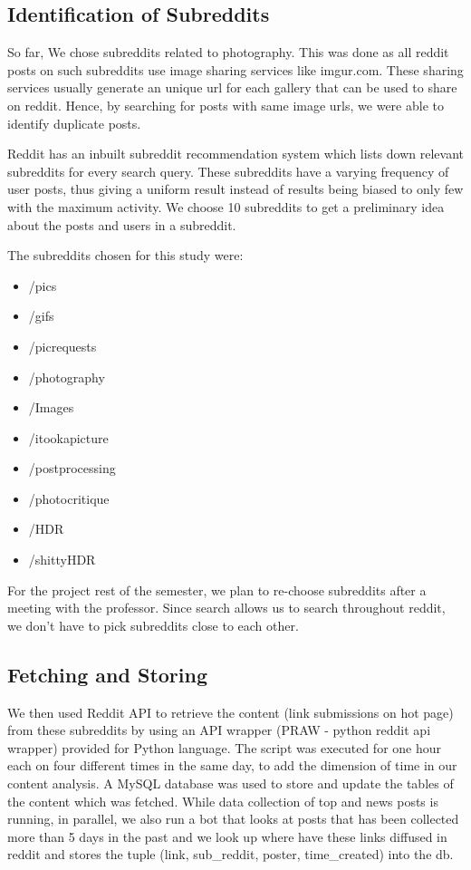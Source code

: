 \documentclass{article} %
\begin{document}
\subsection{Identification of Subreddits}

So far, We chose subreddits related to photography. This was done as all reddit posts on such subreddits use image sharing services like imgur.com. These sharing services usually generate an unique url for each gallery that can be used to share on reddit. Hence, by searching for posts with same image urls, we were able to identify duplicate posts.

Reddit has an inbuilt subreddit recommendation system which lists down relevant subreddits for every search query. These subreddits have a varying frequency of user posts, thus giving a uniform result instead of results being biased to only few with the maximum activity. We choose 10 subreddits to get a preliminary idea about the posts and users in a subreddit.

The subreddits chosen for this study were: 

\begin{itemize}
\item /pics
\item /gifs
\item /picrequests
\item /photography
\item /Images
\item /itookapicture
\item /postprocessing
\item /photocritique
\item /HDR
\item /shittyHDR
\end{itemize}

For the project rest of the semester, we plan to re-choose subreddits after a meeting with the professor. Since search allows us to search throughout reddit, we don't have to pick subreddits close to each other. 

\subsection{Fetching and Storing}

We then used Reddit API to retrieve the content (link submissions on hot page) from these subreddits by using an API wrapper (PRAW - python reddit api wrapper) provided for Python language. The script was executed for one hour each on four different times in the same day, to add the dimension of time in our content analysis. A MySQL database was used to store and update the tables of the content which was fetched. While data collection of top and news posts is running, in parallel, we also run a bot that looks at posts that has been collected more than 5 days in the past and we look up where have these links diffused in reddit and stores the tuple (link, sub\_reddit, poster, time\_created) into the db. 
\end{document}
